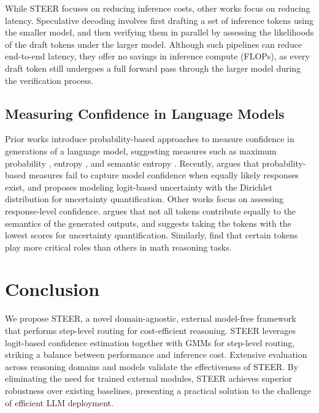 \documentclass[letterpaper]{article} %
\begin{document}

While STEER focuses on reducing inference costs, other works focus on reducing latency. Speculative decoding \citep{leviathan2023fast,li2025eagle} involves first drafting a set of inference tokens using the smaller model, and then verifying them in parallel by assessing the likelihoods of the draft tokens under the larger model. Although such pipelines can reduce end-to-end latency, they offer no savings in inference compute (FLOPs), as every draft token still undergoes a full forward pass through the larger model during the verification process. 
 
\subsection{Measuring Confidence in Language Models}

Prior works introduce probability-based approaches to measure confidence in generations of a language model, suggesting measures such as maximum probability \citep{arora2021typesoutofdistributiontextsdetect,kim2024personadoubleedgedswordmitigating}, entropy \citep{kadavath2022language}, and semantic entropy \citep{farquhar2024detecting}. 
Recently, \citet{ma2025estimatingllmuncertaintyevidence} 
argues that probability-based measures fail to capture model confidence when equally likely responses exist, and proposes modeling logit-based uncertainty with the Dirichlet distribution for uncertainty quantification.
Other works focus on assessing response-level confidence.  \citet{duan2024shift} argues that not all tokens contribute equally to the semantics of the generated outputs, and suggests taking the tokens with the lowest scores for uncertainty quantification. Similarly, \citet{lincritical} find that certain tokens play more critical roles than others in math reasoning tasks.

\section{Conclusion}
% 
We propose STEER, a novel domain-agnostic, external model-free framework that performs step-level routing for cost-efficient reasoning. STEER leverages logit-based confidence estimation together with GMMs for step-level routing, striking a balance between performance and inference cost. 
Extensive evaluation across reasoning domains and models validate the effectiveness of STEER. By eliminating the need for trained external modules, STEER achieves superior robustness over existing baselines, presenting a practical solution to the challenge of efficient LLM deployment.
\end{document}
